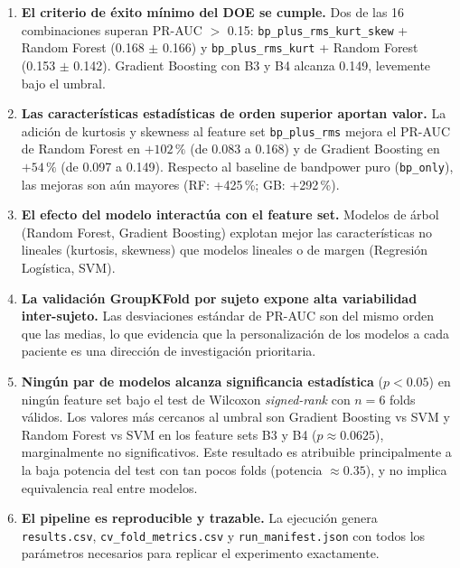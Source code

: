 \documentclass[12pt,a4paper]{article}
\begin{document}
\begin{enumerate}
\item \textbf{El criterio de éxito mínimo del DOE se cumple.} Dos de las 16
  combinaciones superan PR-AUC $>$ 0.15: \texttt{bp\_plus\_rms\_kurt\_skew} + Random
  Forest (0.168 $\pm$ 0.166) y \texttt{bp\_plus\_rms\_kurt} + Random Forest
  (0.153 $\pm$ 0.142). Gradient Boosting con B3 y B4 alcanza 0.149, levemente
  bajo el umbral.

\item \textbf{Las características estadísticas de orden superior aportan valor.}
  La adición de kurtosis y skewness al feature set \texttt{bp\_plus\_rms} mejora el
  PR-AUC de Random Forest en $+102\,\%$ (de 0.083 a 0.168) y de Gradient Boosting
  en $+54\,\%$ (de 0.097 a 0.149). Respecto al baseline de bandpower puro
  (\texttt{bp\_only}), las mejoras son aún mayores (RF: +425\,\%; GB: +292\,\%).

\item \textbf{El efecto del modelo interactúa con el feature set.} Modelos de árbol
  (Random Forest, Gradient Boosting) explotan mejor las características no lineales
  (kurtosis, skewness) que modelos lineales o de margen (Regresión Logística, SVM).

\item \textbf{La validación GroupKFold por sujeto expone alta variabilidad inter-sujeto.}
  Las desviaciones estándar de PR-AUC son del mismo orden que las medias, lo que
  evidencia que la personalización de los modelos a cada paciente es una dirección
  de investigación prioritaria.

\item \textbf{Ningún par de modelos alcanza significancia estadística}
  ($p < 0.05$) en ningún feature set bajo el test de Wilcoxon \textit{signed-rank}
  con $n=6$ folds válidos. Los valores más cercanos al umbral son
  Gradient Boosting vs SVM y Random Forest vs SVM en los feature sets B3 y B4
  ($p \approx 0.0625$), marginalmente no significativos. Este resultado es
  atribuible principalmente a la baja potencia del test con tan pocos folds
  (potencia $\approx 0.35$), y no implica equivalencia real entre modelos.

\item \textbf{El pipeline es reproducible y trazable.} La ejecución genera
  \texttt{results.csv}, \texttt{cv\_fold\_metrics.csv} y \texttt{run\_manifest.json}
  con todos los parámetros necesarios para replicar el experimento exactamente.
\end{enumerate}
\end{document}
